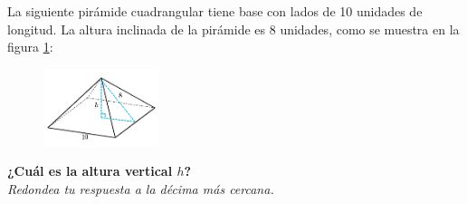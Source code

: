 La siguiente pirámide cuadrangular tiene base con lados de 10 unidades de longitud.
La altura inclinada de la pirámide es 8 unidades, como se muestra en la figura \ref{fig:pitagoras3D_piram_02}:\\
\begin{figure}[H]
    \begin{center}
        \includegraphics[width=0.3\textwidth]{../images/pitagoras3D_piram_02.png}
    \end{center}
    \caption{}
    \label{fig:pitagoras3D_piram_02}
\end{figure}
\textbf{¿Cuál es la altura vertical $h$?}\\
\textit{Redondea tu respuesta a la décima más cercana.}